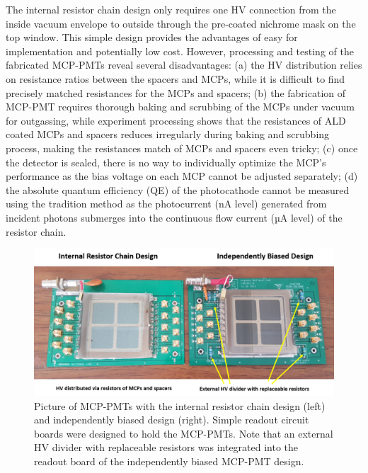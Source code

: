 \documentclass[preprint,5p]{elsarticle}
\begin{document}
The internal resistor chain design only requires one HV connection from the 
inside vacuum envelope to outside through the pre-coated nichrome mask on the 
top window. This simple design provides the advantages of easy for 
implementation and potentially low cost. However, processing and testing of the 
fabricated MCP-PMTs reveal several disadvantages: (a) the HV distribution 
relies on resistance ratios between the spacers and MCPs, while it is difficult 
to find precisely matched resistances for the MCPs and spacers; (b) the 
fabrication of MCP-PMT requires thorough baking and scrubbing of the MCPs under 
vacuum for outgassing, while experiment processing shows that the resistances 
of ALD coated MCPs and spacers reduces irregularly during baking and scrubbing 
process, making the resistances match of MCPs and spacers even tricky; (c) once 
the detector is sealed, there is no way to individually optimize the MCP’s 
performance as the bias voltage on each MCP cannot be adjusted separately; (d) 
the absolute quantum efficiency (QE) of the photocathode cannot be measured 
using the tradition method as the photocurrent (nA level) generated from 
incident photons submerges into the continuous flow current (µA level) of the 
resistor chain.      

\begin{figure}[tbp]
\centering \includegraphics[scale=1.1]{fig/DDlRDV.png}
 \caption{Picture of MCP-PMTs with the internal resistor chain design (left) 
   and independently biased design (right). Simple readout circuit boards were 
   designed to hold the MCP-PMTs. Note that an external HV divider with 
   replaceable resistors was integrated into the readout board of the 
   independently biased MCP-PMT design. } \label{fig:design}
\end{figure}
\end{document}
